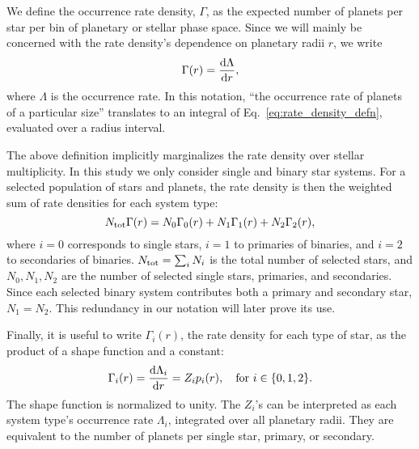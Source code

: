 We define the occurrence rate density, $\Gamma$, as the expected number of 
planets per star per bin of planetary or stellar phase space.
Since we will mainly be concerned with the rate density's dependence on 
planetary radii $r$, we write
\begin{equation}
\Gamma(r) = \frac{{\rm d}\Lambda}{{\rm d}r},
\label{eq:rate_density_defn}
\end{equation}
where $\Lambda$ is the occurrence rate.
In this notation, ``the occurrence rate of planets of a particular size'' 
translates to an integral of Eq.~\ref{eq:rate_density_defn}, evaluated over a 
radius interval.

The above definition implicitly marginalizes the rate density over stellar 
multiplicity.
In this study we only consider single and binary star systems.
For a selected population of stars and planets, the rate density is then 
the weighted sum of rate densities for each system type:
\begin{equation}
N_{\rm tot} \Gamma(r) =
N_0 \Gamma_0(r) +
N_1 \Gamma_1(r) +
N_2 \Gamma_2(r),
\label{eq:rate_density_marginalized}
\end{equation}
where $i=0$ corresponds to single stars, $i=1$ to primaries of 
binaries, and $i=2$ to secondaries of binaries.
$N_{\rm tot} = \sum_i N_i$ is the total number of selected stars, and 
$N_0,N_1,N_2$ are the number of selected single stars, primaries, and 
secondaries.
Since each selected binary system contributes both a 
primary and secondary star, $N_1=N_2$.
This redundancy in our notation will later prove its use.

Finally, it is useful to write 
$\Gamma_i(r)$, the rate density for each type of star, as the product of a 
shape function and a constant:
\begin{equation}
\Gamma_i(r) = \frac{{\rm d}\Lambda_i}{{\rm d}r} = Z_i p_i(r),
\quad {\rm for}\ i\in\{0,1,2\}.
\label{eq:rate_density_shape}
\end{equation}
The shape function is normalized to unity.
The $Z_i$'s can be interpreted as each system type's occurrence rate 
$\Lambda_i$, integrated over all planetary radii.
They are equivalent to the number of planets per single star, primary, or 
secondary.

